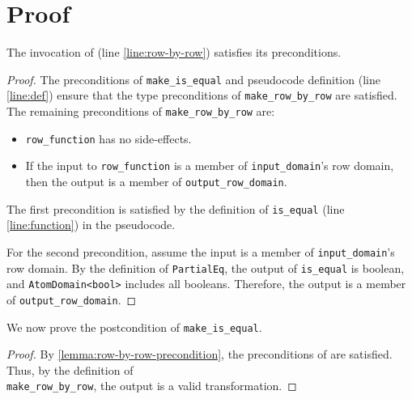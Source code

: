 \documentclass{article}
\begin{document}
\section{Proof}

\begin{lemma}
    The invocation of  (line \ref{line:row-by-row}) satisfies its preconditions.
\end{lemma}

\begin{proof}
    \label{lemma:row-by-row-precondition}
    The preconditions of \texttt{make\_is\_equal} and pseudocode definition (line \ref{line:def}) ensure that the type preconditions of \texttt{make\_row\_by\_row} are satisfied. 
    The remaining preconditions of \texttt{make\_row\_by\_row} are:
    \begin{itemize}
        \item \texttt{row\_function} has no side-effects.
        \item If the input to \texttt{row\_function} is a member of \texttt{input\_domain}'s row domain, then the output is a member of \texttt{output\_row\_domain}.
    \end{itemize}

    The first precondition is satisfied by the definition of \texttt{is\_equal} (line \ref{line:function}) in the pseudocode.

    For the second precondition, assume the input is a member of \texttt{input\_domain}'s row domain. 
    By the definition of \texttt{PartialEq}, the output of \texttt{is\_equal} is boolean, and \texttt{AtomDomain<bool>} includes all booleans.
    Therefore, the output is a member of \texttt{output\_row\_domain}.
\end{proof}

We now prove the postcondition of \texttt{make\_is\_equal}.
\begin{proof}
By \ref{lemma:row-by-row-precondition}, the preconditions of  are satisfied.
Thus, by the definition of \\\texttt{make\_row\_by\_row}, the output is a valid transformation.
\end{proof}
\end{document}

